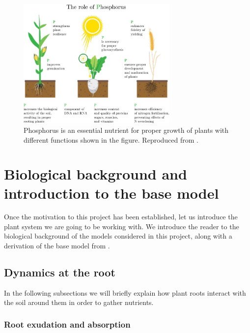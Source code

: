 \documentclass[11pt]{article}
\numberwithin{equation}{section}
\begin{document}
\begin{figure}[!htb]
     \centering
     \includegraphics[width=0.7\textwidth]{Figures/PhosphorusPlantRoles.pdf}
     \caption{Phosphorus is an essential nutrient for proper growth of plants with  different functions shown in the figure. Reproduced from \cite{fertilizers}.}
     \label{fig:Phos}
 \end{figure}
\section{Biological background and introduction to the base model}
\label{sec:Bio-background}

Once the motivation to this project has been established, let us introduce the plant system we are going to be working with. We introduce the reader to the biological background of the models considered in this project, along with a derivation of the base model from \cite{Ptashnyk-2011}.

\subsection{Dynamics at the root}
In the following subsections we will briefly explain how plant roots interact with the soil around them in order to gather nutrients.

\subsubsection{Root exudation and absorption}
\end{document}
